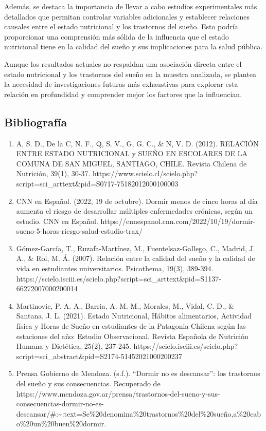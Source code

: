 \documentclass[
  10pt,
  letterpaper,
  DIV=11,
  numbers=noendperiod,
  twocolumn]{scrartcl}
\begin{document}
Además, se destaca la importancia de llevar a cabo estudios
experimentales más detallados que permitan controlar variables
adicionales y establecer relaciones causales entre el estado nutricional
y los trastornos del sueño. Esto podría proporcionar una comprensión más
sólida de la influencia que el estado nutricional tiene en la calidad
del sueño y sus implicaciones para la salud pública.

Aunque los resultados actuales no respaldan una asociación directa entre
el estado nutricional y los trastornos del sueño en la muestra
analizada, se plantea la necesidad de investigaciones futuras más
exhaustivas para explorar esta relación en profundidad y comprender
mejor los factores que la influencian.

\newpage
\onecolumn

\hypertarget{bibliografuxeda}{%
\subsection{Bibliografía}\label{bibliografuxeda}}

\begin{enumerate}
\def\labelenumi{\arabic{enumi}.}
\item
  A, S. D., De la C, N. F., Q, S. V., G, G. C., \& N, V. D. (2012).
  RELACIÓN ENTRE ESTADO NUTRICIONAL y SUEÑO EN ESCOLARES DE LA COMUNA DE
  SAN MIGUEL, SANTIAGO, CHILE. Revista Chilena de Nutrición, 39(1),
  30-37.
  https://www.scielo.cl/scielo.php?script=sci\_arttext\&pid=S0717-75182012000100003
\item
  CNN en Español. (2022, 19 de octubre). Dormir menos de cinco horas al
  día aumenta el riesgo de desarrollar múltiples enfermedades crónicas,
  según un estudio. CNN en Español.
  https://cnnespanol.cnn.com/2022/10/19/dormir-sueno-5-horas-riesgo-salud-estudio-trax/
\item
  Gómez-García, T., Ruzafa-Martínez, M., Fuentelsaz-Gallego, C., Madrid,
  J. A., \& Rol, M. Á. (2007). Relación entre la calidad del sueño y la
  calidad de vida en estudiantes universitarios. Psicothema, 19(3),
  389-394.
  https://scielo.isciii.es/scielo.php?script=sci\_arttext\&pid=S1137-66272007000200014
\item
  Martinovic, P. A. A., Barria, A. M. M., Morales, M., Vidal, C. D., \&
  Santana, J. L. (2021). Estado Nutricional, Hábitos alimentarios,
  Actividad física y Horas de Sueño en estudiantes de la Patagonia
  Chilena según las estaciones del año: Estudio Observacional. Revista
  Española de Nutrición Humana y Dietética, 25(2), 237-245.
  https://scielo.isciii.es/scielo.php?script=sci\_abstract\&pid=S2174-51452021000200237
\item
  Prensa Gobierno de Mendoza. (s.f.). ``Dormir no es descansar'': los
  trastornos del sueño y sus consecuencias. Recuperado de
  https://www.mendoza.gov.ar/prensa/trastornos-del-sueno-y-sus-consecuencias-dormir-no-es-descansar/\#:\textasciitilde:text=Se\%20denomina\%20trastornos\%20del\%20sueño,a\%20cabo\%20un\%20buen\%20dormir.
\end{enumerate}
\end{document}
